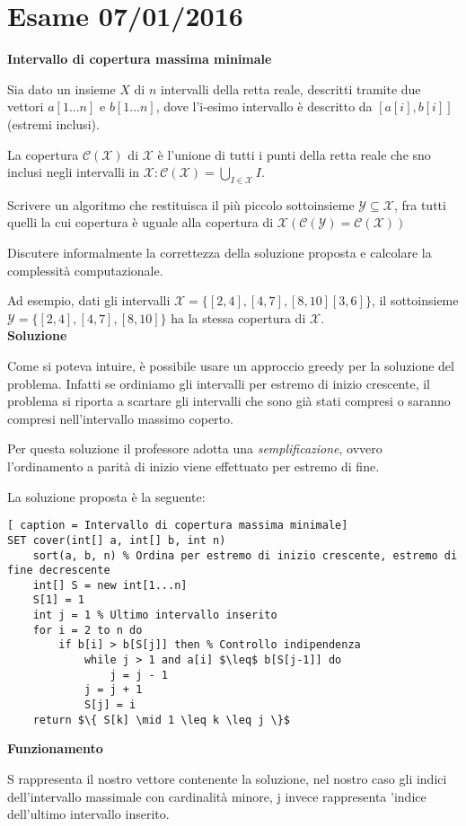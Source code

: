 \documentclass[../cheatSheetAlgoritmi.tex]{subfiles}
\begin{document}
\section{Esame 07/01/2016}
\textbf{Intervallo di copertura massima minimale} 

Sia dato un insieme $X$ di $n$ intervalli della retta reale, descritti tramite due vettori $a[1...n]$ e $b[1...n]$, dove l'i-esimo intervallo è descritto da $[ a[i], b[i] ]$ (estremi inclusi). 

La copertura $\mathcal{C(X)}$ di $\mathcal{X}$ è l'unione di tutti i punti della retta reale che sno inclusi negli intervalli in $\mathcal{X} : \mathcal{C(X)} = \bigcup_{I \in \mathcal{X}} I$. 

Scrivere un algoritmo che restituisca il più piccolo sottoinsieme $\mathcal{Y} \subseteq \mathcal{X}$, fra tutti quelli la cui copertura è uguale alla copertura di $\mathcal{X (C(Y) =C(X))}$ 

Discutere informalmente la correttezza della soluzione proposta e calcolare la complessità computazionale. 

Ad esempio, dati gli intervalli $\mathcal{X} = \{[2,4], [4,7], [8,10] [3,6]\}$, il sottoinsieme $\mathcal{Y}= \{[2,4], [4,7], [8,10]\}$ ha la stessa copertura di $\mathcal{X}$. \\
\textbf{Soluzione} 

Come si poteva intuire, è possibile usare un approccio greedy per la soluzione del problema. Infatti se ordiniamo gli intervalli per estremo di inizio crescente, il problema si riporta a scartare gli intervalli che sono già stati compresi o saranno compresi nell'intervallo massimo coperto. 

Per questa soluzione il professore adotta una \emph{semplificazione}, ovvero l'ordinamento a parità di inizio viene effettuato per estremo di fine. 

La soluzione proposta è la seguente: 
\begin{lstlisting}[ caption = Intervallo di copertura massima minimale]
SET cover(int[] a, int[] b, int n)
	sort(a, b, n) % Ordina per estremo di inizio crescente, estremo di fine decrescente
	int[] S = new int[1...n]
	S[1] = 1
	int j = 1 % Ultimo intervallo inserito
	for i = 2 to n do
		if b[i] > b[S[j]] then % Controllo indipendenza
			while j > 1 and a[i] $\leq$ b[S[j-1]] do
				j = j - 1
			j = j + 1
			S[j] = i
	return $\{ S[k] \mid 1 \leq k \leq j \}$ 
\end{lstlisting}
\textbf{Funzionamento} 

S rappresenta il nostro vettore contenente la soluzione, nel nostro caso gli indici dell'intervallo massimale con cardinalità minore, j invece rappresenta 'indice dell'ultimo intervallo inserito. 
\end{document}
